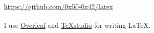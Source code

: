 \documentclass{article}
\begin{document}
	\url{https://github.com/0x50-0x42/latex}
	
	\paragraph{}
	
	I use \href{https://www.overleaf.com/}{Overleaf} and \href{https://www.texstudio.org/}{TeXstudio} for writing \LaTeX.
\end{document}
